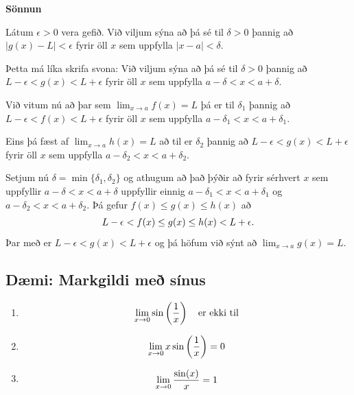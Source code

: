\documentclass[b5paper,10pt,icelandic]{sphinxmanual}
\begin{document}
\textbf{Sönnun}

Látum \(\epsilon>0\) vera gefið. Við viljum sýna að þá sé til \(\delta>0\) þannig
að \(|g(x)-L|<\epsilon\) fyrir öll \(x\) sem uppfylla \(|x-a|<\delta\).

Þetta má líka skrifa svona:
Við viljum sýna að þá sé til \(\delta>0\) þannig
að \(L-\epsilon<g(x)<L+\epsilon\) fyrir öll \(x\) sem uppfylla \(a-\delta < x<a+\delta\).

Við vitum nú að þar sem \(\lim_{x\to a} f(x) = L\) þá er til \(\delta_1\)
þannig að \(L-\epsilon<f(x)<L+\epsilon\) fyrir öll \(x\) sem uppfylla \(a-\delta_1 < x<a+\delta_1\).

Eins þá fæst af \(\lim_{x\to a} h(x) = L\) að til er \(\delta_2\)
þannig að \(L-\epsilon<g(x)<L+\epsilon\) fyrir öll \(x\) sem uppfylla \(a-\delta_2 < x<a+\delta_2\).

Setjum nú \(\delta = \min\{\delta_1,\delta_2\}\) og athugum að það þýðir að fyrir sérhvert \(x\) sem
uppfyllir \(a-\delta < x < a+\delta\) uppfyllir einnig \(a-\delta_1 < x<a+\delta_1\)
og \(a-\delta_2 < x<a+\delta_2\). Þá gefur \(f(x)\leq g(x)\leq h(x)\) að
\begin{gather}
\begin{split}L-\epsilon<f(x) \leq g(x) \leq h(x) < L+\epsilon.\end{split}\notag
\end{gather}
Þar með er \(L-\epsilon < g(x) < L+\epsilon\) og þá höfum við sýnt að
\(\lim_{x\to a} g(x) = L\).


\subsection{Dæmi: Markgildi með sínus}
\label{kafli02:daemi-markgildi-me-sinus}\begin{enumerate}
\item {} \begin{gather}
\begin{split}\lim_{x\to 0} \sin\left(\frac 1x\right) \quad \text{er ekki til}\end{split}\notag
\end{gather}
\item {} \begin{gather}
\begin{split}\lim_{x\to 0} x\sin\left(\frac 1x\right) = 0\end{split}\notag
\end{gather}
\item {} \begin{gather}
\begin{split}\lim_{x \to 0} \frac{\sin(x)}{x} = 1\end{split}\notag
\end{gather}
\end{enumerate}
\end{document}
